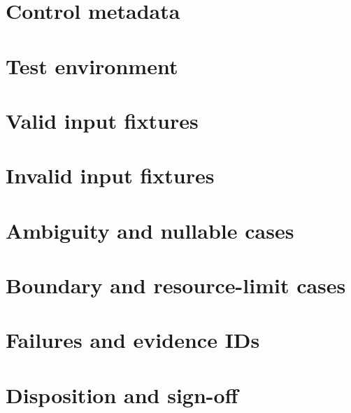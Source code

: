 \documentclass[11pt,letterpaper]{article}
\begin{document}
\makedoctitle\makedocsummary
\section{Control metadata}
\section{Test environment}
\section{Valid input fixtures}
\section{Invalid input fixtures}
\section{Ambiguity and nullable cases}
\section{Boundary and resource-limit cases}
\section{Failures and evidence IDs}
\section{Disposition and sign-off}
\end{document}
